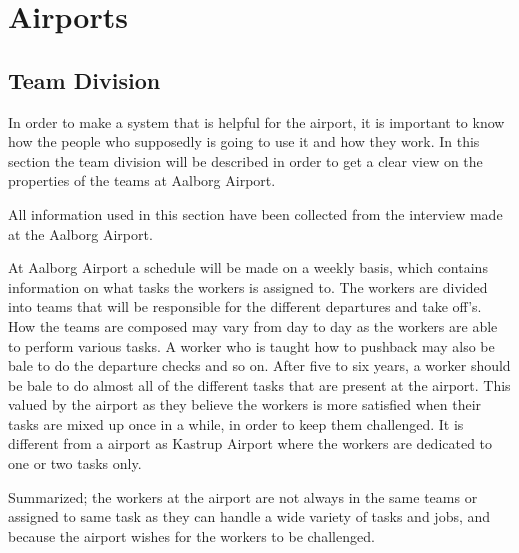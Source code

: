 \chapter{Airports}
\section{Team Division}
In order to make a system that is helpful for the airport, it is important to know how the people who supposedly is going to use it and how they work. In this section the team division will be described in order to get a clear view on the properties of the teams at Aalborg Airport.

All information used in this section have been collected from the interview made at the Aalborg Airport.



At Aalborg Airport a schedule will be made on a weekly basis, which contains information on what tasks the workers is assigned to. The workers are divided into teams that will be responsible for the different departures and take off's. How the teams are composed may vary from day to day as the workers are able to perform various tasks. A worker who is taught how to pushback may also be bale to do the departure checks and so on. After five to six years, a worker should be bale to do almost all of the different tasks that are present at the airport. This valued by the airport as they believe the workers is more satisfied when their tasks are mixed up once in a while, in order to keep them challenged. It is different from a airport as Kastrup Airport where the workers are dedicated to one or two tasks only.  


Summarized; the workers at the airport are not always in the same teams or assigned to same task as they can handle a wide variety of tasks and jobs, and because the airport wishes for the workers to be challenged.